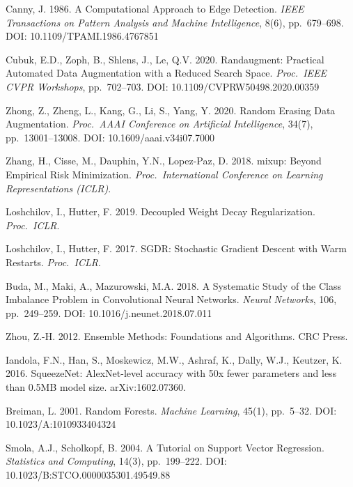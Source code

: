 \documentclass[9pt, a4paper, twocolumn]{article}
\begin{document}
\begin{sloppypar}
\begin{enumerate}[label={[\arabic*]}, leftmargin=*, itemsep=2pt, parsep=0pt, font=\small]
\item Canny, J. 1986. A Computational Approach to Edge Detection. \textit{IEEE Transactions on Pattern Analysis and Machine Intelligence}, 8(6), pp.~679--698. DOI: 10.1109/TPAMI.1986.4767851

\item Cubuk, E.D., Zoph, B., Shlens, J., Le, Q.V. 2020. Randaugment: Practical Automated Data Augmentation with a Reduced Search Space. \textit{Proc.\ IEEE CVPR Workshops}, pp.~702--703. DOI: 10.1109/CVPRW50498.2020.00359

\item Zhong, Z., Zheng, L., Kang, G., Li, S., Yang, Y. 2020. Random Erasing Data Augmentation. \textit{Proc.\ AAAI Conference on Artificial Intelligence}, 34(7), pp.~13001--13008. DOI: 10.1609/aaai.v34i07.7000

\item Zhang, H., Cisse, M., Dauphin, Y.N., Lopez-Paz, D. 2018. mixup: Beyond Empirical Risk Minimization. \textit{Proc.\ International Conference on Learning Representations (ICLR)}.

\item Loshchilov, I., Hutter, F. 2019. Decoupled Weight Decay Regularization. \textit{Proc.\ ICLR}.

\item Loshchilov, I., Hutter, F. 2017. SGDR: Stochastic Gradient Descent with Warm Restarts. \textit{Proc.\ ICLR}.

\item Buda, M., Maki, A., Mazurowski, M.A. 2018. A Systematic Study of the Class Imbalance Problem in Convolutional Neural Networks. \textit{Neural Networks}, 106, pp.~249--259. DOI: 10.1016/j.neunet.2018.07.011

\item Zhou, Z.-H. 2012. Ensemble Methods: Foundations and Algorithms. CRC Press.

\item Iandola, F.N., Han, S., Moskewicz, M.W., Ashraf, K., Dally, W.J., Keutzer, K. 2016. SqueezeNet: AlexNet-level accuracy with 50x fewer parameters and less than 0.5MB model size. arXiv:1602.07360.

\item Breiman, L. 2001. Random Forests. \textit{Machine Learning}, 45(1), pp.~5--32. DOI: 10.1023/A:1010933404324

\item Smola, A.J., Scholkopf, B. 2004. A Tutorial on Support Vector Regression. \textit{Statistics and Computing}, 14(3), pp.~199--222. DOI: 10.1023/B:STCO.0000035301.49549.88


\end{enumerate}
\end{sloppypar}
\end{document}
